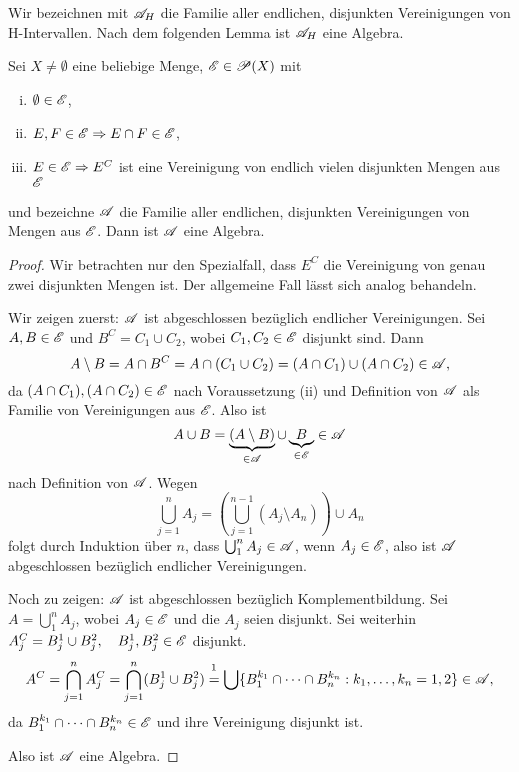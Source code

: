 Wir bezeichnen mit $\mathscr{A}_H$ die Familie aller endlichen, disjunkten Vereinigungen von H-Intervallen. Nach dem folgenden Lemma ist $\mathscr{A}_H$ eine Algebra.

\begin{lem}
 Sei $X \ne \emptyset$ eine beliebige Menge, $\mathscr{E} \in \mathscr{P}(X)$ mit
 \begin{enumerate}[(i)]
  \item $\emptyset \in \mathscr{E}$,
  \item $E,F \in \mathscr{E} \Rightarrow E \cap F \in \mathscr{E}$,
  \item $E \in \mathscr{E} \Rightarrow E^C$ ist eine Vereinigung von endlich vielen disjunkten Mengen aus $\mathscr{E}$
 \end{enumerate}
und bezeichne $\mathscr{A}$ die Familie aller endlichen, disjunkten Vereinigungen von Mengen aus $\mathscr{E}$. Dann ist $\mathscr{A}$ eine Algebra.
\end{lem}

\begin{proof}
 Wir betrachten nur den Spezialfall, dass $E^C$ die Vereinigung von genau zwei disjunkten Mengen ist. Der allgemeine Fall lässt sich analog behandeln.
 
 Wir zeigen zuerst: $\mathscr{A}$ ist abgeschlossen bezüglich endlicher Vereinigungen. Sei $A,B \in \mathscr{E}$ und $B^C = C_1 \cup C_2$, wobei $C_1, C_2 \in \mathscr{E}$ disjunkt sind. Dann
 \[ A \setminus B = A \cap B^C = A \cap( C_1 \cup C_2 ) = (A \cap C_1) \cup (A \cap C_2) \in \mathscr{A}, \]
 da $(A \cap C_1), (A \cap C_2) \in \mathscr{E}$ nach Voraussetzung (ii) und Definition von $\mathscr{A}$ als Familie von Vereinigungen aus $\mathscr{E}$. Also ist
 \[ A \cup B = \underbrace{(A \setminus B)}_{\in \mathscr{A}} \cup \underbrace{B}_{\in \mathscr{E}} \in \mathscr{A} \]
 nach Definition von $\mathscr{A}$. Wegen
 \[ \bigcup_{j=1}^n A_j = \left( \bigcup_{j=1}^{n-1}( A_j \setminus A_n ) \right) \cup A_n \]
 folgt durch Induktion über $n$, dass $\bigcup_1^n A_j \in \mathscr{A}$, wenn $A_j \in \mathscr{E}$, also ist $\mathscr{A}$ abgeschlossen bezüglich endlicher Vereinigungen.
 
 Noch zu zeigen: $\mathscr{A}$ ist abgeschlossen bezüglich Komplementbildung. Sei $A = \bigcup_1^n A_j$, wobei $A_j \in \mathscr{E}$ und die $A_j$ seien disjunkt. Sei weiterhin $A_j^C = B_j^1 \cup B_j^2, \quad B_j^1, B_j^2 \in \mathscr{E}$ disjunkt.
 \[ A^C = \bigcap_{j=1}^n A_j^C = \bigcap_{j=1}^n (B_j^1 \cup B_j^2) \overset{\footnotemark}{=} \bigcup \{ B_1^{k_1} \cap \cdots \cap B_n^{k_n} : k_1, \ldots, k_n = 1,2 \} \in \mA, \]
 da $B_1^{k_1} \cap \cdots \cap B_n^{k_n} \in \mathscr{E}$ und ihre Vereinigung disjunkt ist.
 
 Also ist $\mathscr{A}$ eine Algebra.
\end{proof}

